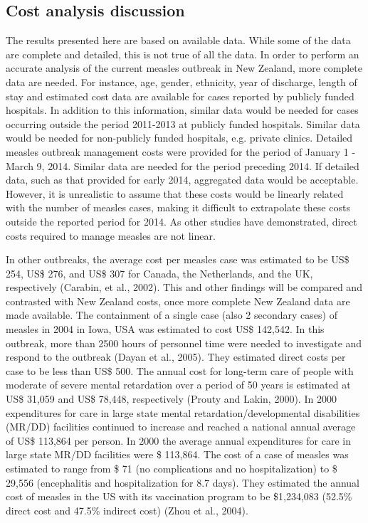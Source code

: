 \documentclass{article}
\begin{document}
\subsection{Cost analysis discussion}
The results presented here are based on available data. While some of the data are complete and detailed, this is not true of all the data. In order to perform an accurate analysis of the current measles outbreak in New Zealand, more complete data are needed. For instance, age, gender, ethnicity, year of discharge, length of stay and estimated cost data are available for cases reported by publicly funded hospitals. In addition to this information, similar data would be needed for cases occurring outside the period 2011-2013 at publicly funded hospitals. Similar data would be needed for non-publicly funded hospitals, e.g. private clinics.
Detailed measles outbreak management costs were provided for the period of January 1 - March 9, 2014. Similar data are needed for the period preceding 2014. If detailed data, such as that provided for early 2014, aggregated data would be acceptable. However, it is unrealistic to assume that these costs would be linearly related with the number of measles cases, making it difficult to extrapolate these costs outside the reported period for 2014. As other studies have demonstrated, direct costs required to manage measles are not linear.

In other outbreaks, the average cost per measles case was estimated to be US\$ 254, US\$ 276, and US\$ 307 for Canada, the Netherlands, and the UK, respectively (Carabin, et al., 2002). This and other findings will be compared and contrasted with New Zealand costs, once more complete New Zealand data are made available.
The containment of a single case (also 2 secondary cases) of measles in 2004 in Iowa, USA was estimated to cost US\$ 142,542. In this outbreak, more than 2500 hours of personnel time were needed to investigate and respond to the outbreak (Dayan et al., 2005). They estimated direct costs per case to be less than US\$ 500. 
The annual cost for long-term care of people with moderate of severe mental retardation over a period of 50 years is estimated at US\$ 31,059 and US\$ 78,448, respectively (Prouty and Lakin, 2000). In 2000 expenditures for care in large state mental retardation/developmental disabilities (MR/DD) facilities continued to increase and reached a national annual average of US\$ 113,864 per person. In 2000 the average annual expenditures for care in large state MR/DD facilities were \$ 113,864. The cost of a case of measles was estimated to range from \$ 71 (no complications and no hospitalization) to \$ 29,556 (encephalitis and hospitalization for 8.7 days). They estimated the annual cost of measles in the US with its vaccination program to be \$1,234,083 (52.5\% direct cost and 47.5\% indirect cost) (Zhou et al., 2004).
\end{document}

